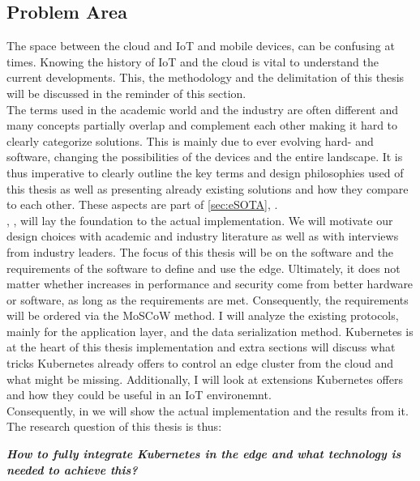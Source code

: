 \subsection{Problem Area}\label{sec:problemArea}

The space between the cloud and IoT and mobile devices, can be confusing at times. Knowing the history of IoT and the cloud is vital to understand the current developments. This, the methodology and the delimitation of this thesis will be discussed in the reminder of this section.\\
The terms used in the academic world and the industry are often different and many concepts partially overlap and complement each other making it hard to clearly categorize solutions. This is mainly due to ever evolving hard- and software, changing the possibilities of the devices and the entire landscape. It is thus imperative to clearly outline the key terms and design philosophies used of this thesis as well as presenting already existing solutions and how they compare to each other. These aspects are part of \cref{sec:eSOTA}, .\\
, , will lay the foundation to the actual implementation. We will motivate our design choices with academic and industry literature as well as with interviews from industry leaders. The focus of this thesis will be on the software and the requirements of the software to define and use the edge. Ultimately, it does not matter whether increases in performance and security come from better hardware or software, as long as the requirements are met. Consequently, the requirements will be ordered via the MoSCoW method. I will analyze the existing protocols, mainly for the application layer, and the data serialization method. Kubernetes is at the heart of this thesis implementation and extra sections will discuss what tricks Kubernetes already offers to control an edge cluster from the cloud and what might be missing. Additionally, I will look at extensions Kubernetes offers and how they could be useful in an IoT environemnt.\\
Consequently, in  we will show the actual implementation and the results from it.\\
The research question of this thesis is thus:
\begin{displayquote}\begin{center}
{\textit{\textbf{How to fully integrate Kubernetes in the edge and what technology is needed to achieve this?}}}
\end{center}\end{displayquote}








